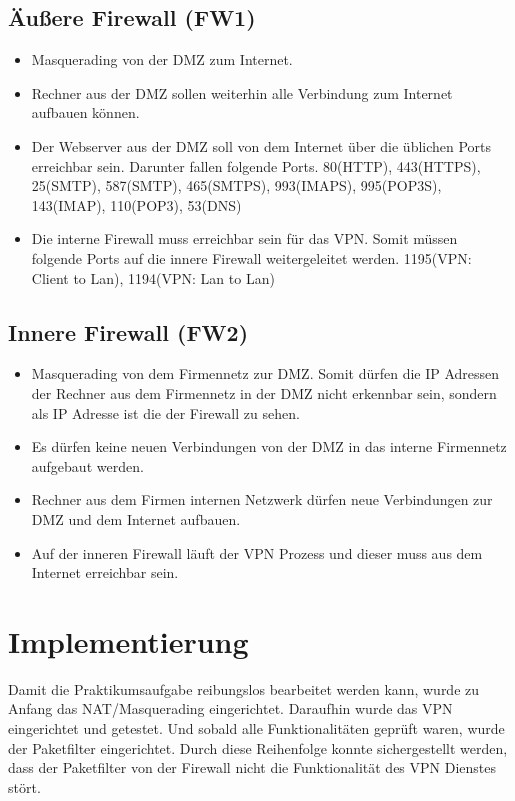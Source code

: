\subsection{Äußere Firewall (FW1)}
\begin{itemize}
\item Masquerading von der DMZ zum Internet.
\item Rechner aus der DMZ sollen weiterhin alle Verbindung zum Internet aufbauen können.
\item Der Webserver aus der DMZ soll von dem Internet über die üblichen Ports erreichbar sein. Darunter fallen folgende Ports. 80(HTTP), 443(HTTPS), 25(SMTP), 587(SMTP), 465(SMTPS), 993(IMAPS), 995(POP3S), 143(IMAP), 110(POP3), 53(DNS)
\item Die interne Firewall muss erreichbar sein für das VPN. Somit müssen folgende Ports auf die innere Firewall weitergeleitet werden. 1195(VPN: Client to Lan), 1194(VPN: Lan to Lan)
\end{itemize}

\subsection{Innere Firewall (FW2)}
\begin{itemize}
\item Masquerading von dem Firmennetz zur DMZ. Somit dürfen die IP Adressen der Rechner aus dem Firmennetz in der DMZ nicht erkennbar sein, sondern als IP Adresse ist die der Firewall zu sehen.
\item Es dürfen keine neuen Verbindungen von der DMZ in das interne Firmennetz aufgebaut werden.
\item Rechner aus dem Firmen internen Netzwerk dürfen neue Verbindungen zur DMZ und dem Internet aufbauen.
\item Auf der inneren Firewall läuft der VPN Prozess und dieser muss aus dem Internet erreichbar sein.	
\end{itemize}

\section{Implementierung}
Damit die Praktikumsaufgabe reibungslos bearbeitet werden kann, wurde zu Anfang das NAT/Masquerading eingerichtet. Daraufhin wurde das VPN eingerichtet und getestet. Und sobald alle Funktionalitäten geprüft waren, wurde der Paketfilter eingerichtet. Durch diese Reihenfolge konnte sichergestellt werden, dass der Paketfilter von der Firewall nicht die Funktionalität des VPN Dienstes stört.

